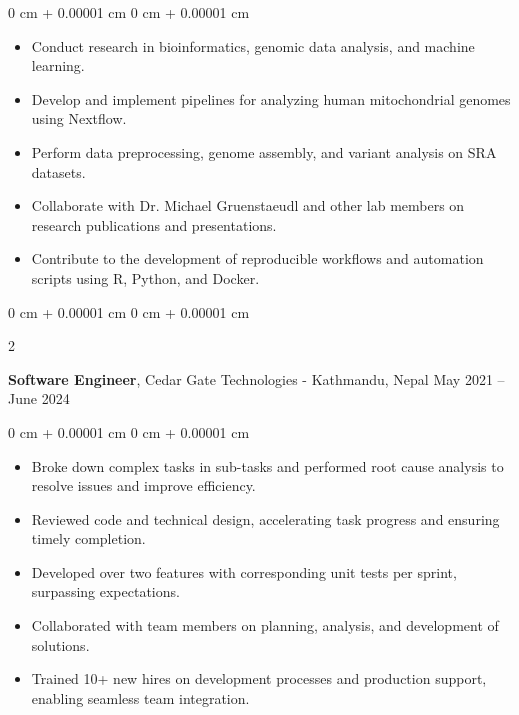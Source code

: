 \documentclass[10pt, letterpaper]{article}
\newenvironment{highlights}{
    \begin{itemize}[
        topsep=0.10 cm,
        parsep=0.10 cm,
        partopsep=0pt,
        itemsep=0.05cm,
        leftmargin=0 cm + 10pt
    ]
}{
    \end{itemize}
} %
\newenvironment{onecolentry}{
    \begin{adjustwidth}{
        0 cm + 0.00001 cm
    }{
        0 cm + 0.00001 cm
    }
}{
    \end{adjustwidth}
} %
\newenvironment{twocolentry}[2][]{
    \onecolentry
    \def\secondColumn{#2}
    \setcolumnwidth{\fill, 4.5 cm}
    \begin{paracol}{2}
}{
    \switchcolumn \raggedleft \secondColumn
    \end{paracol}
    \endonecolentry
} %
\begin{document}
        \vspace{0.10 cm}
        \begin{onecolentry}
            \begin{highlights}
                \item Conduct research in bioinformatics, genomic data analysis, and machine learning.
                \item Develop and implement pipelines for analyzing human mitochondrial genomes using Nextflow.
                \item Perform data preprocessing, genome assembly, and variant analysis on SRA datasets.
                \item Collaborate with Dr. Michael Gruenstaeudl and other lab members on research publications and presentations.
                \item Contribute to the development of reproducible workflows and automation scripts using R, Python, and Docker.
            \end{highlights}
        \end{onecolentry}
         \vspace{0.5 cm}
        \begin{twocolentry}{
            May 2021 – June 2024
        }
            \textbf{Software Engineer}, Cedar Gate Technologies - Kathmandu, Nepal\end{twocolentry}

        \vspace{0.10 cm}
        \begin{onecolentry}
            \begin{highlights}
                \item Broke down complex tasks in sub-tasks and performed root cause analysis to resolve issues and improve efficiency.
                \item Reviewed code and technical design, accelerating task progress and ensuring timely completion.
                \item Developed over two features with corresponding unit tests per sprint, surpassing expectations.
                \item Collaborated with team members on planning, analysis, and development of solutions.
                \item Trained 10+ new hires on development processes and production support, enabling seamless team integration.
            \end{highlights}
        \end{onecolentry}
\end{document}

